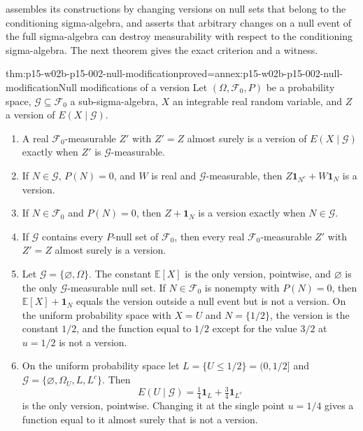  assembles its constructions by changing
versions on null sets that belong to the conditioning sigma-algebra, and
asserts that arbitrary changes on a null event of the full
sigma-algebra can destroy measurability with respect to the conditioning
sigma-algebra. The next theorem gives the exact criterion and a witness.

\begin{hbtheorem}{thm:p15-w02b-p15-002-null-modification}{proved=annex:p15-w02b-p15-002-null-modification}{Null modifications of a version}
Let \((\Omega,\mathcal F_0,P)\) be a probability space,
\(\mathcal G\subseteq\mathcal F_0\) a sub-sigma-algebra, \(X\) an
integrable real random variable, and \(Z\) a version of
\(E(X\mid\mathcal G)\).
\begin{enumerate}
\item A real \(\mathcal F_0\)-measurable \(Z'\) with \(Z'=Z\) almost
      surely is a version of \(E(X\mid\mathcal G)\) exactly when \(Z'\) is
      \(\mathcal G\)-measurable.
\item If \(N\in\mathcal G\), \(P(N)=0\), and \(W\) is real and
      \(\mathcal G\)-measurable, then
      \(Z\mathbf1_{N^c}+W\mathbf1_N\) is a version.
\item If \(N\in\mathcal F_0\) and \(P(N)=0\), then
      \(Z+\mathbf1_N\) is a version exactly when \(N\in\mathcal G\).
\item If \(\mathcal G\) contains every \(P\)-null set of
      \(\mathcal F_0\), then every real \(\mathcal F_0\)-measurable
      \(Z'\) with \(Z'=Z\) almost surely is a version.
\item Let \(\mathcal G=\{\varnothing,\Omega\}\). The constant
      \(\mathbb E[X]\) is the only version, pointwise, and \(\varnothing\)
      is the only \(\mathcal G\)-measurable null set. If
      \(N\in\mathcal F_0\) is nonempty with \(P(N)=0\), then
      \(\mathbb E[X]+\mathbf1_N\) equals the version outside a null event
      but is not a version. On the uniform probability space with
      \(X=U\) and \(N=\{1/2\}\), the version is the constant \(1/2\), and
      the function equal to \(1/2\) except for the value \(3/2\) at
      \(u=1/2\) is not a version.
\item On the uniform probability space let
      \(L=\{U\leq1/2\}=(0,1/2]\) and
      \(\mathcal G=\{\varnothing,\Omega_U,L,L^c\}\). Then
      \[
       E(U\mid\mathcal G)=\tfrac14\mathbf1_L+\tfrac34\mathbf1_{L^c}
      \]
      is the only version, pointwise. Changing it at the single point
      \(u=1/4\) gives a function equal to it almost surely that is not a
      version.
\end{enumerate}
\end{hbtheorem}


